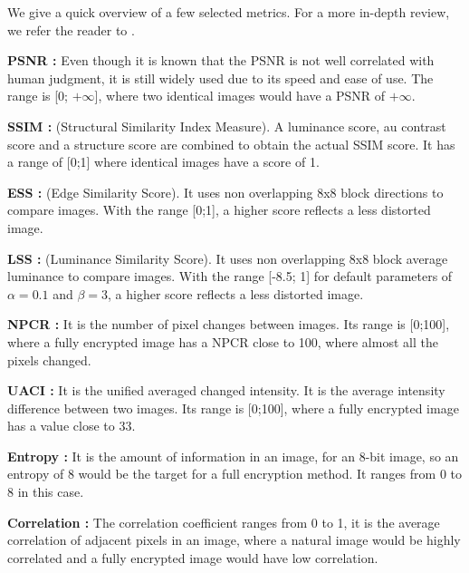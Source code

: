 \documentclass{article}
\begin{document}
We give a quick overview of a few selected metrics. For a more in-depth review, we refer the reader to \cite{metrics_deficits}.

\textbf{PSNR :} Even though it is known that the PSNR is not well correlated with human judgment, it is still widely used due to its speed and ease of use. The range is [0; $+\infty$], where two identical images would have a PSNR of $+\infty$.

\textbf{SSIM :} \cite{ssim}(Structural Similarity Index Measure). A luminance score, au contrast score and a structure score are combined to obtain the actual SSIM score. It has a range of [0;1] where identical images have a score of 1.

\textbf{ESS :} \cite{ess_lss}(Edge Similarity Score). It uses non overlapping 8x8 block directions to compare images. With the range [0;1], a higher score reflects a less distorted image.

\textbf{LSS :} \cite{ess_lss}(Luminance Similarity Score). It uses non overlapping 8x8 block average luminance to compare images. With the range [-8.5; 1] for default parameters of $\alpha=0.1$ and $\beta=3$, a higher score reflects a less distorted image.

\textbf{NPCR :} \cite{npcr_uaci}It is the number of pixel changes between images. Its range is [0;100], where a fully encrypted image has a NPCR close to 100, where almost all the pixels changed.

\textbf{UACI :} \cite{npcr_uaci}It is the unified averaged changed intensity. It is the average intensity difference between two images. Its range is [0;100], where a fully encrypted image has a value close to 33.

\textbf{Entropy :} It is the amount of information in an image, for an 8-bit image, so an entropy of 8 would be the target for a full encryption method. It ranges from 0 to 8 in this case.

\textbf{Correlation :} The correlation coefficient ranges from 0 to 1, it is the average correlation of adjacent pixels in an image, where a natural image would be highly correlated and a fully encrypted image would have low correlation.

\newpage
\end{document}
